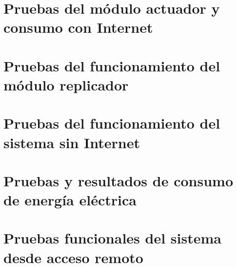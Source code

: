 \section{Pruebas del módulo actuador y consumo con Internet}
\section{Pruebas del funcionamiento del módulo replicador}
\section{Pruebas del funcionamiento del sistema sin Internet}
\section{Pruebas y resultados de consumo de energía eléctrica}
\section{Pruebas funcionales del sistema desde acceso remoto}

